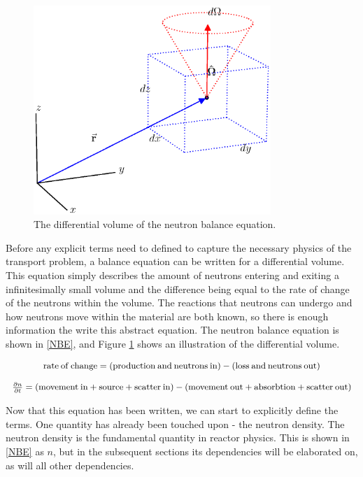 \begin{figure}[h!] 
  \centering
    \includegraphics[width=0.8\textwidth,trim= 0cm 2.5cm 0cm 0cm]{graphics/diff_balance.eps} 
     \caption{The differential volume of the neutron balance equation. \label{diff_volume}}
\end{figure}

Before any explicit terms need to defined to capture the necessary physics of the transport problem, a balance equation can be written for a differential volume.  This equation simply describes the amount of neutrons entering and exiting a infinitesimally small volume and the difference being equal to the rate of change of the neutrons within the volume.  The reactions that neutrons can undergo and how neutrons move within the material are both known, so there is enough information the write this abstract equation.   The neutron balance equation is shown in \eqref{NBE}, and Figure \ref{diff_volume} shows an illustration of the differential volume.

\begin{equation}
\footnotesize
\begin{array}{c}
\mathrm{rate\:of\:change} = (\mathrm{production\:and\:neutrons\:in}) - (\mathrm{loss\:and\:neutrons\:out}) \\
\\
\frac{\partial n}{\partial t} = ( \mathrm{movement\:in} + \mathrm{source} + \mathrm{scatter\:in}) - ( \mathrm{movement\:out} + \mathrm{absorbtion} + \mathrm{scatter\:out})
\end{array}
\label{NBE}
\end{equation}

Now that this equation has been written, we can start to explicitly define the terms.  One quantity has already been touched upon - the neutron density.  The neutron density is the fundamental quantity in reactor physics.  This is shown in \eqref{NBE} as $n$, but in the subsequent sections its dependencies will be elaborated on, as will all other dependencies.


